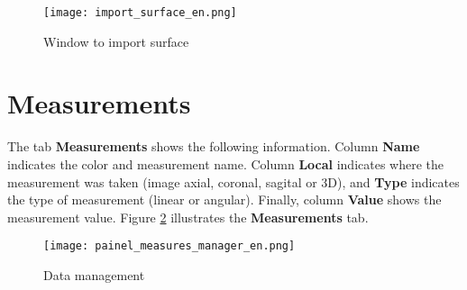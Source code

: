 \begin{figure}[!htb]
\centering
\texttt{[image: import\_surface\_en.png]}
\caption{Window to import surface}
\label{fig:import_surface}
\end{figure}

\newpage


\section{Measurements}

The tab \textbf{Measurements} shows the following information. Column \textbf{Name} indicates the color and measurement
name. Column \textbf{Local} indicates where the measurement was taken (image axial, coronal, sagital or 3D), and
\textbf{Type} indicates the type of measurement (linear or angular). Finally, column \textbf{Value} shows the
measurement value. Figure \ref{fig:manager_mensuares} illustrates the \textbf{Measurements} tab.

\begin{figure}[!htb]
\centering
\texttt{[image: painel\_measures\_manager\_en.png]}
\caption{Data management}
\label{fig:manager_mensuares}
\end{figure}

